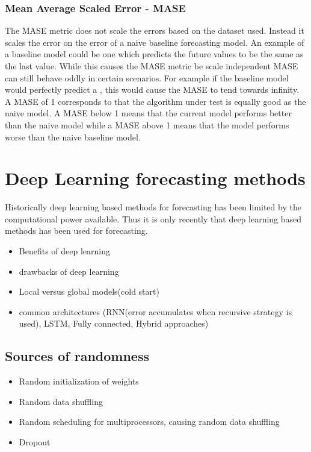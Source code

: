 \subsubsection{Mean Average Scaled Error - MASE}
The MASE metric does not scale the errors based on the dataset used. Instead it scales the error on the error of a naive baseline forecasting model. An example of a baseline model could be one which predicts the future values to be the same as the last value. While this causes the MASE metric be scale independent MASE can still behave oddly in certain scenarios. For example if the  baseline model would perfectly predict a , this would cause the MASE to tend towards infinity. A MASE of 1 corresponds to that the algorithm under test is equally good as the naive model. A MASE below 1 means that the current model performs better than the naive model while a MASE above 1 means that the model performs worse than the naive baseline model. \cite{hyndman_forecasting_nodate}

\section{Deep Learning forecasting methods}
\label{subsec:deep_learning_methods}
Historically deep learning based methods for forecasting has been limited by the computational power available. Thus it is only recently that deep learning based methods has been used for forecasting.

\begin{itemize}
\item Benefits of deep learning
\item drawbacks of deep learning
\item Local versus global models(cold start)
\item common architectures (RNN(error accumulates when recursive strategy is used), LSTM, Fully connected, Hybrid approaches)
\end{itemize}
\subsection{Sources of randomness}
\begin{itemize}
\item Random initialization of weights
\item Random data shuffling
\item Random scheduling for multiprocessors, causing random data shuffling
\item Dropout
\end{itemize}
